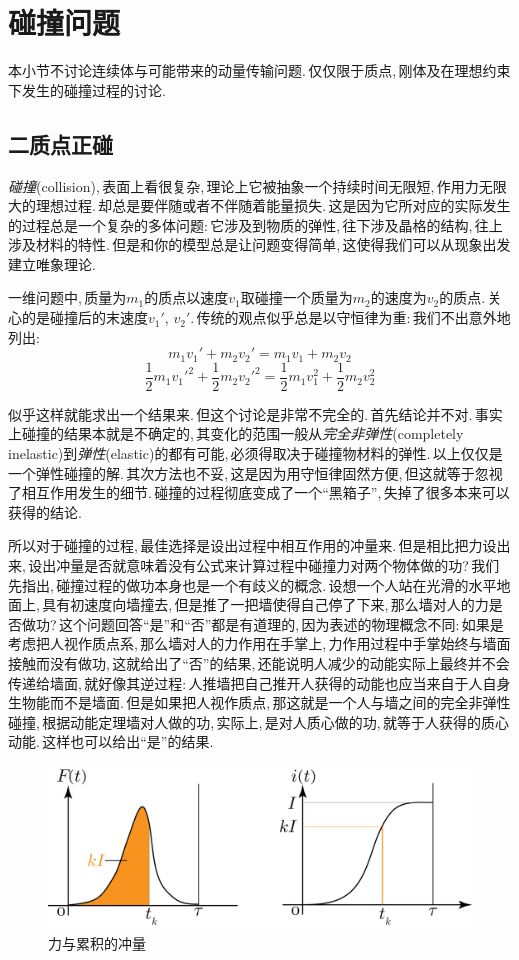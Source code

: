 \section{碰撞问题}
本小节不讨论连续体与可能带来的动量传输问题.\,仅仅限于质点,\,刚体及在理想约束下发生的碰撞过程的讨论.

\subsection{二质点正碰}
\emph{碰撞}(collision),\,表面上看很复杂,\,理论上它被抽象一个持续时间无限短,\,作用力无限大的理想过程.\,却总是要伴随或者不伴随着能量损失.\,这是因为它所对应的实际发生的过程总是一个复杂的多体问题:\,它涉及到物质的弹性,\,往下涉及晶格的结构,\,往上涉及材料的特性.\,但是和你的模型总是让问题变得简单,\,这使得我们可以从现象出发建立唯象理论.

一维问题中,\,质量为$m_1$的质点以速度$v_1$取碰撞一个质量为$m_2$的速度为$v_2$的质点.\,关心的是碰撞后的末速度$v_1',\,v_2'$.\,传统的观点似乎总是以守恒律为重:\,我们不出意外地列出:
\[m_1v_1'+m_2v_2'=m_1v_1+m_2v_2\]
\[\frac{1}{2}m_1v_1'^2+\frac{1}{2}m_2v_2'^2=\frac{1}{2}m_1v_1^2+\frac{1}{2}m_2v_2^2\]

似乎这样就能求出一个结果来.\,但这个讨论是非常不完全的.\,首先结论并不对.\,事实上碰撞的结果本就是不确定的,\,其变化的范围一般从\emph{完全非弹性}(completely inelastic)到\emph{弹性}(elastic)的都有可能,\,必须得取决于碰撞物材料的弹性.\,以上仅仅是一个弹性碰撞的解.\,其次方法也不妥,\,这是因为用守恒律固然方便,\,但这就等于忽视了相互作用发生的细节.\,碰撞的过程彻底变成了一个``黑箱子'',\,失掉了很多本来可以获得的结论.

所以对于碰撞的过程,\,最佳选择是设出过程中相互作用的冲量来.\,但是相比把力设出来,\,设出冲量是否就意味着没有公式来计算过程中碰撞力对两个物体做的功?\,我们先指出,\,碰撞过程的做功本身也是一个有歧义的概念.\,设想一个人站在光滑的水平地面上,\,具有初速度向墙撞去,\,但是推了一把墙使得自己停了下来,\,那么墙对人的力是否做功?\,这个问题回答``是''和``否''都是有道理的,\,因为表述的物理概念不同:\,如果是考虑把人视作质点系,\,那么墙对人的力作用在手掌上,\,力作用过程中手掌始终与墙面接触而没有做功,\,这就给出了``否''的结果,\,还能说明人减少的动能实际上最终并不会传递给墙面,\,就好像其逆过程:\,人推墙把自己推开人获得的动能也应当来自于人自身生物能而不是墙面.\,但是如果把人视作质点,\,那这就是一个人与墙之间的完全非弹性碰撞,\,根据动能定理墙对人做的功,\,实际上,\,是对人质心做的功,\,就等于人获得的质心动能.\,这样也可以给出``是''的结果.

\begin{figure}[H]
\centering
\includegraphics[width=16cm]{image/6-1-12.png}
\caption{力与累积的冲量}
\end{figure}


